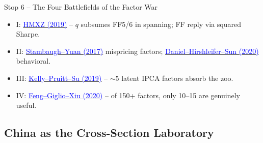 \documentclass{beamer}
\begin{document}
\begin{frame}{Stop 6 -- The Four Battlefields of the Factor War}
\begin{center}
\end{center}
\begin{itemize}\small
  \item \alert{I:} \href{https://doi.org/10.1093/rof/rfy032}{\textcolor{blue}{HMXZ (2019)}} -- $q$ subsumes FF5/6 in spanning; FF reply via squared Sharpe.
  \item \alert{II:} \href{https://doi.org/10.1093/rfs/hhw107}{\textcolor{blue}{Stambaugh--Yuan (2017)}} mispricing factors; \href{https://doi.org/10.1093/rfs/hhz069}{\textcolor{blue}{Daniel--Hirshleifer--Sun (2020)}} behavioral.
  \item \alert{III:} \href{https://doi.org/10.1016/j.jfineco.2019.05.001}{\textcolor{blue}{Kelly--Pruitt--Su (2019)}} -- $\sim 5$ latent IPCA factors absorb the zoo.
  \item \alert{IV:} \href{https://doi.org/10.1111/jofi.12883}{\textcolor{blue}{Feng--Giglio--Xiu (2020)}} -- of 150+ factors, only 10--15 are genuinely useful.
\end{itemize}
\end{frame}

\subsection{China as the Cross-Section Laboratory}
\end{document}
